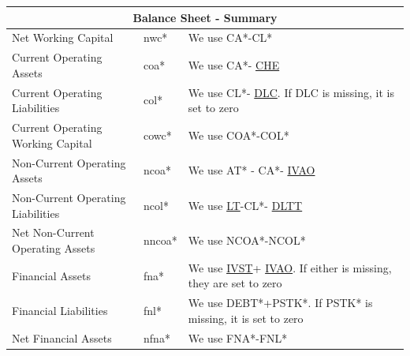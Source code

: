 \documentclass[12pt,title,fleqn]{article}
\begin{document}
{\begin{longtable}{@{\extracolsep{\fill}}|m{5cm}|l|m{8cm}|@{}}
	\hline 
	\multicolumn{3}{|c|}{\textbf{Balance Sheet - Summary}} \\
	\hline 	
	
	Net Working Capital & nwc\mbox{*} & We use CA\mbox{*}-CL\mbox{*} \\

	Current Operating Assets & coa\mbox{*} & We use CA\mbox{*}-
	\href{https://wrds-www.wharton.upenn.edu/data-dictionary/form_metadata/comp_na_daily_all_funda_balancesheetitems/CHE/}{CHE} \\
	
	Current Operating Liabilities & col\mbox{*} & We use CL\mbox{*}-
	\href{https://wrds-www.wharton.upenn.edu/data-dictionary/form_metadata/comp_na_daily_all_funda_balancesheetitems/DLC/}{DLC}. If DLC is missing, it is set to zero \\
	
	Current Operating Working Capital & cowc\mbox{*} & We use COA\mbox{*}-COL\mbox{*} \\
	
	Non-Current Operating Assets & ncoa\mbox{*} & We use AT\mbox{*} - CA\mbox{*}-
	\href{https://wrds-www.wharton.upenn.edu/data-dictionary/form_metadata/comp_na_daily_all_funda_balancesheetitems/IVAO/}{IVAO} \\
	
	Non-Current Operating Liabilities & ncol\mbox{*} & We use 
	\href{https://wrds-www.wharton.upenn.edu/data-dictionary/form_metadata/comp_na_daily_all_funda_balancesheetitems/LT/}{LT}-CL\mbox{*}-
	\href{https://wrds-www.wharton.upenn.edu/data-dictionary/form_metadata/comp_na_daily_all_funda_balancesheetitems/DLTT/}{DLTT} \\
	
	Net Non-Current Operating Assets & nncoa\mbox{*} & We use NCOA\mbox{*}-NCOL\mbox{*} \\
	
	Financial Assets & fna\mbox{*} & We use \href{https://wrds-www.wharton.upenn.edu/data-dictionary/form_metadata/comp_na_daily_all_funda_balancesheetitems/IVST/}{IVST}+
	\href{https://wrds-www.wharton.upenn.edu/data-dictionary/form_metadata/comp_na_daily_all_funda_balancesheetitems/IVAO/}{IVAO}. If either is missing, they are set to zero\\
	
	Financial Liabilities & fnl\mbox{*} & We use DEBT\mbox{*}+PSTK\mbox{*}. If PSTK\mbox{*} is missing, it is set to zero \\
	
	Net Financial Assets & nfna\mbox{*} & We use FNA\mbox{*}-FNL\mbox{*} \\
	

\end{longtable}}
\end{document}
